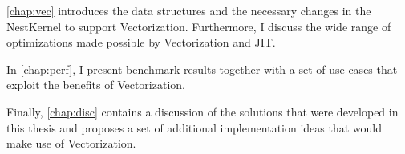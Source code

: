 \autoref{chap:vec} introduces the data structures and the necessary changes in the NestKernel to support Vectorization. Furthermore, I discuss the wide range of optimizations made possible by Vectorization and JIT.

In \autoref{chap:perf}, I present benchmark results together with a set of use cases that exploit the benefits of Vectorization.

Finally, \autoref{chap:disc} contains a discussion of the solutions that were developed in this thesis and proposes a set of additional implementation ideas that would make use of Vectorization.

\cleardoublepage
